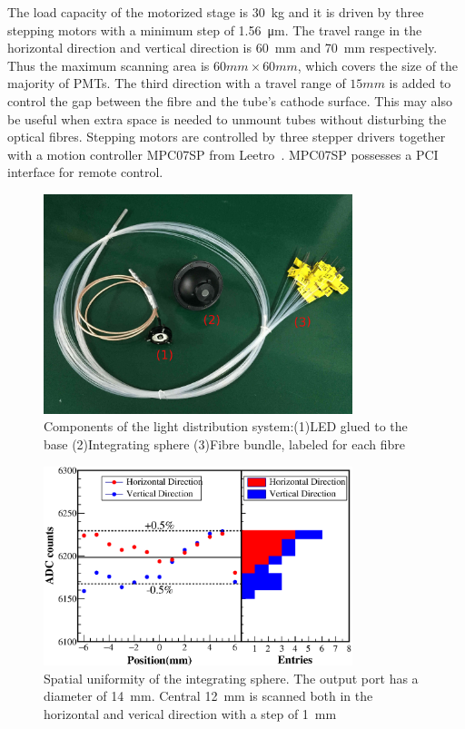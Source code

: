 \documentclass[5p, times]{elsarticle}
\begin{document}
The load capacity of the motorized stage is \SI{30}{\kilo\gram} and it is driven by three stepping motors with a minimum step of \SI{1.56}{\micro\meter}.%
The travel range in the horizontal direction and vertical direction is \SI{60}{\milli\meter} and \SI{70}{\milli\meter} respectively.%
Thus the maximum scanning area is $60mm\times60mm$, which covers the size of the majority of PMTs.
The third direction with a travel range of $15mm$ is added to control the gap between the fibre and the tube's cathode surface.
This may also be useful when extra space is needed to unmount tubes without disturbing the optical fibres. 
Stepping motors are controlled by three stepper drivers together with a motion controller MPC07SP from Leetro~\cite{leetro}.
MPC07SP possesses a PCI interface for remote control.

\begin{figure}
 \centering
 \includegraphics[width=90mm]{fibre_led_insphere_crop}
\caption{Components of the light distribution system:(1)LED glued to the base (2)Integrating sphere (3)Fibre bundle, labeled for each fibre}
\label{fig:fibre_led_sphere}
\end{figure} 

\begin{figure}
 \centering
 \includegraphics[width=90mm]{uniformity_integratingsphere}
\caption{Spatial uniformity of the integrating sphere.
The output port has a diameter of \SI{14}{\milli\meter}.
Central \SI{12}{\milli\meter} is scanned both in the horizontal and verical direction with a step of \SI{1}{\milli\meter}}
\label{fig:uniformity_integratingsphere}
\end{figure} 
\end{document}
